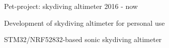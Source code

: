 \begin{cventries}

\cventry
{} %
{Pet-project: skydiving altimeter} %
{} %
{2016 - now} %
{ %
\begin{cvitems}
\item {Development of skydiving altimeter for personal use}
\item {STM32/NRF52832-based sonic skydiving altimeter}
\end{cvitems}
}
\newline
\newline

\end{cventries}